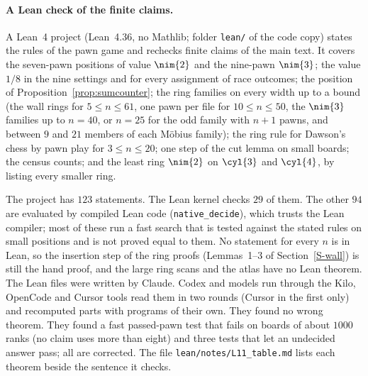 \paragraph{A Lean check of the finite claims.}
A Lean~4 project (Lean~4.36, no Mathlib; folder \texttt{lean/} of the code copy) states the rules of the pawn game and
rechecks finite claims of the main text. It covers the seven-pawn positions of value $\nim{2}$ and the nine-pawn $\nim{3}$;
the value $1/8$ in the nine settings and for every assignment of race outcomes; the position of
Proposition~\ref{prop:sumcounter}; the ring families on every width up to a bound (the wall rings for $5\le n\le 61$,
one pawn per file for $10\le n\le 50$, the $\nim{3}$ families up to $n=40$, or $n=25$ for the odd family with $n+1$
pawns, and between $9$ and $21$ members of each M\"obius family); the ring rule for Dawson's chess by pawn play for
$3\le n\le 20$; one step of the cut lemma on small boards; the census counts; and the least ring $\nim{2}$ on $\cyl{3}$
and $\cyl{4}$, by listing every smaller ring.

The project has $123$ statements. The Lean kernel checks $29$ of them. The other $94$ are evaluated by compiled Lean
code (\texttt{native\_decide}), which trusts the Lean compiler; most of these run a fast search that is tested against
the stated rules on small positions and is not proved equal to them. No statement for every $n$ is in Lean, so the
insertion step of the ring proofs (Lemmas~1--3 of Section~\ref{S-wall}) is still the hand proof, and the large ring
scans and the atlas have no Lean theorem. The Lean files were written by Claude. Codex and models run through the Kilo,
OpenCode and Cursor tools read them in two rounds (Cursor in the first only) and recomputed parts with programs of their own. They found no wrong
theorem. They found a fast passed-pawn test that fails on boards of about $1000$ ranks (no claim uses more than eight)
and three tests that let an undecided answer pass; all are corrected. The file \texttt{lean/notes/L11\_table.md} lists
each theorem beside the sentence it checks.

